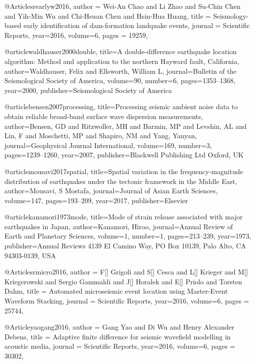 @Article{srearlyw2016,
  author =	 {Wei-An Chao and Li Zhao and Su-Chin Chen and Yih-Min Wu and Chi-Hsuan Chen and Hsin-Hua Huang},
  title =	 {Seismology-based early identification of dam-formation landquake events},
  journal =	 {Scientific Reports},
  year=2016,
  volume=6,
  pages =	 {19259},
}


@article{waldhauser2000double,
  title={A double-difference earthquake location algorithm: Method and application to the northern Hayward fault, California},
  author={Waldhauser, Felix and Ellsworth, William L},
  journal={Bulletin of the Seismological Society of America},
  volume={90},
  number={6},
  pages={1353--1368},
  year={2000},
  publisher={Seismological Society of America}
}

@article{bensen2007processing,
  title={Processing seismic ambient noise data to obtain reliable broad-band surface wave dispersion measurements},
  author={Bensen, GD and Ritzwoller, MH and Barmin, MP and Levshin, AL and Lin, F and Moschetti, MP and Shapiro, NM and Yang, Yanyan},
  journal={Geophysical Journal International},
  volume={169},
  number={3},
  pages={1239--1260},
  year={2007},
  publisher={Blackwell Publishing Ltd Oxford, UK}
}

@article{mousavi2017spatial,
  title={Spatial variation in the frequency-magnitude distribution of earthquakes under the tectonic framework in the Middle East},
  author={Mousavi, S Mostafa},
  journal={Journal of Asian Earth Sciences},
  volume={147},
  pages={193--209},
  year={2017},
  publisher={Elsevier}
}

@article{kanamori1973mode,
  title={Mode of strain release associated with major earthquakes in Japan},
  author={Kanamori, Hiroo},
  journal={Annual Review of Earth and Planetary Sciences},
  volume={1},
  number={1},
  pages={213--239},
  year={1973},
  publisher={Annual Reviews 4139 El Camino Way, PO Box 10139, Palo Alto, CA 94303-0139, USA}
}

@Article{srmicro2016,
  author =	 {F[] Grigoli and S[] Cesca and L[] Krieger and M[] Kriegerowski and Sergio Gammaldi and J[] Horalek and E[] Priolo and Torsten Dahm},
  title =	 {Automated microseismic event location using Master-Event Waveform Stacking},
  journal =	 {Scientific Reports},
  year=2016,
  volume=6,
  pages =	 {25744},
}

@Article{yaogang2016,
  author =	 {Gang Yao and Di Wu and Henry Alexander Debens},
  title =	 {Adaptive finite difference for seismic wavefield modelling in acoustic media},
  journal =	 {Scientific Reports},
  year=2016,
  volume=6,
  pages =	 {30302},
}

